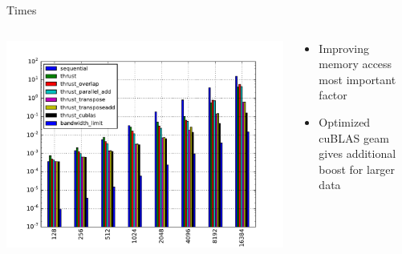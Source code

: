 \documentclass{beamer}
\begin{document}
\begin{frame}{Times}
  \begin{columns}
    \begin{column}{7cm}
      \includegraphics[scale=0.4]{imgs/all_times.pdf} 
    \end{column}
    \begin{column}{3cm}
      \begin{itemize}
        \item Improving memory access most important factor
        \item Optimized cuBLAS geam gives additional boost for larger data
      \end{itemize}
    \end{column}
  \end{columns}
\end{frame} 
\end{document}
